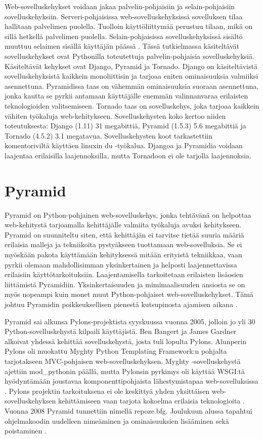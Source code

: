 \documentclass[utf8]{gradu3}
\begin{document}
Web-sovelluskehykset voidaan jakaa palvelin-pohjaisiin ja selain-pohjaisiin sovelluskehyksiin. Serveri-pohjaisissa web-sovelluskehyksissä sovelluksen tilaa hallitaan palvelimen puolella. Tuolloin käyttöliittymää perustuu tilaan, mikä on sillä hetkellä palvelimen puolella. Selain-pohjaisissa sovelluskehyksissä sisältö muuttuu selaimen sisällä käyttäjän päässä \parencite{vosloo}. Tässä tutkielmassa käsiteltävät sovelluskehykset ovat Pythonilla toteutettuja palvelin-pohjaisia sovelluskehyksiä. Käsiteltävät kehykset ovat Django, Pyramid ja Tornado. Django on käsiteltävistä sovelluskehyksistä kaikkein monoliittisin ja tarjoaa eniten ominaisuuksia valmiiksi asennettuna. Pyramidissa taas on vähemmän ominaisuuksia suoraan asennettuna, jonka kautta se pyrkii antamaan käyttäjälle enemmän valinnanvaraa erilaisten teknologioiden valitsemiseen. Tornado taas on sovelluskehys, joka tarjoaa kaikkein vähiten työkaluja web-kehitykseen. Sovelluskehysten koko kertoo niiden toteutuksesta: Django (1.11) 31 megabittiä, Pyramid (1.5.3) 5.6 megabittiä ja Tornado (4.5.2) 3.1 megatavua. Sovelluskehysten koot tarkastettiin komentoriviltä käyttäen linuxin du -työkalua. Djangoa ja Pyramidia voidaan laajentaa erilaisilla laajennoksilla, mutta Tornadoon ei ole tarjolla laajennoksia. 

\section{Pyramid}
Pyramid on Python-pohjainen web-sovelluskehys, jonka tehtävänä on helpottaa web-kehitystä tarjoamalla
kehittäjälle valmiita työkaluja avuksi kehitykseen. Pyramid on suunniteltu siten, että kehittäjän ei tarvitse tietää suuria määriä erilaisia malleja ja tekniikoita pystyäkseen tuottamaan web-sovelluksia. Se ei myöskään pakota käyttämään kehityksessä mitään erityistä tekniikkaa, vaan pyrkii olemaan mahdollisimman yksinkertainen ja helposti laajennettavissa erilaisiin käyttötarkoituksiin. Laajentamisella tarkoitetaan erilaisten lisäosien liittämistä Pyramidiin. Yksinkertaisuuden ja mimimaalisuuden ansiosta se on myös nopeampi kuin monet muut Python-pohjaiset web-sovelluskehykset. Tämä johtuu Pyramidin poikkeuksellisen pienestä kutsupinosta ajamisen aikana \parencite{pyramid_intr}. 

Pyramid sai alkunsa Pylons-projektista syyskuussa vuonna 2005, jolloin jo yli 30 Python-sovelluskehystä kilpaili käyttäjistä. Ben Bangert ja James Gardner alkoivat yhdessä kehittää sovelluskehystä, josta tuli lopulta Pylons. Alunperin Pylons oli
muokattu Myghty Python Templating Framework:n pohjalta tarjotakseen MVC-pohjaisen web-sovelluskehyksen. Myghty -sovelluskehystä ajettiin mod\_pythonin päällä, mutta Pylonsin pyrkimys oli käyttää WSGI:tä hyödyntämään joustavaa komponenttipohjaista lähestymistapaa web-sovelluksissa \parencite{pylons_history}. Pylons projektin tarkoituksena ei ole keskittyä yhden yksittäisen web-sovelluskehyksen kehittämiseen vaan tarjota kokoelma erilaisia teknologioita \parencite{pylons_about}. Vuonna 2008 Pyramid tunnettiin nimellä repoze.bfg. Joulukuun alussa tapahtui ohjelmakoodin uudelleen nimeäminen ja ominaisuuksien lisääminen sekä poistaminen \parencite{pyramid_about}.
\end{document}
